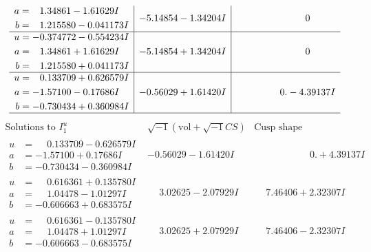 \documentclass[1p]{elsarticle_modified}
\theoremstyle{definition}
\newcommand{\I}{\sqrt{-1}}
\begin{document}
$$\begin{array}{c|c|c}
\begin{aligned}
a &= \phantom{-}1.34861 - 1.61629 I \\
b &= \phantom{-}1.215580 - 0.041173 I\end{aligned}
 & -5.14854 - 1.34204 I & \phantom{-0.000000 } 0 \\ \hline\begin{aligned}
u &= -0.374772 - 0.554234 I \\
a &= \phantom{-}1.34861 + 1.61629 I \\
b &= \phantom{-}1.215580 + 0.041173 I\end{aligned}
 & -5.14854 + 1.34204 I & \phantom{-0.000000 } 0 \\ \hline\begin{aligned}
u &= \phantom{-}0.133709 + 0.626579 I \\
a &= -1.57100 - 0.17686 I \\
b &= -0.730434 + 0.360984 I\end{aligned}
 & -0.56029 + 1.61420 I & \phantom{-0.000000 } 0. - 4.39137 I\\
 \hline 
 \end{array}$$\newpage$$\begin{array}{c|c|c}  
\text{Solutions to }I^u_{1}& \I (\text{vol} + \sqrt{-1}CS) & \text{Cusp shape}\\
 \hline 
\begin{aligned}
u &= \phantom{-}0.133709 - 0.626579 I \\
a &= -1.57100 + 0.17686 I \\
b &= -0.730434 - 0.360984 I\end{aligned}
 & -0.56029 - 1.61420 I & \phantom{-0.000000 -}0. + 4.39137 I \\ \hline\begin{aligned}
u &= \phantom{-}0.616361 + 0.135780 I \\
a &= \phantom{-}1.04478 - 1.01297 I \\
b &= -0.606663 + 0.683575 I\end{aligned}
 & \phantom{-}3.02625 - 2.07929 I & \phantom{-}7.46406 + 2.32307 I \\ \hline\begin{aligned}
u &= \phantom{-}0.616361 - 0.135780 I \\
a &= \phantom{-}1.04478 + 1.01297 I \\
b &= -0.606663 - 0.683575 I\end{aligned}
 & \phantom{-}3.02625 + 2.07929 I & \phantom{-}7.46406 - 2.32307 I \\ \hline\begin{aligned}

\end{aligned}
\end{array}$$
\end{document}
